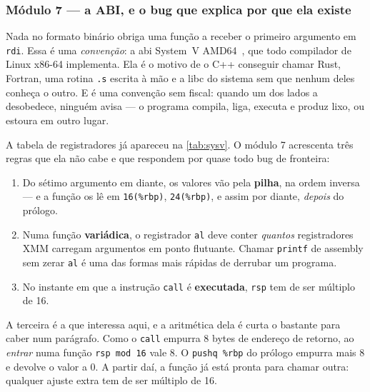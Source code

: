 \subsubsection{Módulo 7 --- a ABI, e o bug que explica por que ela existe}
\label{sec:asm-abi-bug}

\begin{porque}
Nada no formato binário obriga uma função a receber o primeiro argumento em
\texttt{rdi}. Essa é uma \emph{convenção}: a \gls{abi} System~V
AMD64~\cite{sysvabi}, que todo compilador de Linux x86-64 implementa. Ela é o
motivo de o C++ conseguir chamar Rust, Fortran, uma rotina \texttt{.s} escrita
à mão e a libc do sistema sem que nenhum deles conheça o outro. E é uma
convenção sem fiscal: quando um dos lados a desobedece, ninguém avisa --- o
programa compila, liga, executa e produz lixo, ou estoura em outro lugar.
\end{porque}

A tabela de registradores já apareceu na \cref{tab:sysv}. O módulo 7 acrescenta
três regras que ela não cabe e que respondem por quase todo bug de fronteira:

\begin{enumerate}
\item Do sétimo argumento em diante, os valores vão pela \textbf{pilha}, na
      ordem inversa --- e a função os lê em \texttt{16(\%rbp)},
      \texttt{24(\%rbp)}, e assim por diante, \emph{depois} do prólogo.
\item Numa função \textbf{variádica}, o registrador \texttt{al} deve conter
      \emph{quantos} registradores XMM carregam argumentos em ponto flutuante.
      Chamar \texttt{printf} de assembly sem zerar \texttt{al} é uma das formas
      mais rápidas de derrubar um programa.
\item No instante em que a instrução \texttt{call} é \textbf{executada},
      \texttt{rsp} tem de ser múltiplo de 16.
\end{enumerate}

A terceira é a que interessa aqui, e a aritmética dela é curta o bastante para
caber num parágrafo. Como o \texttt{call} empurra 8 bytes de endereço de
retorno, ao \emph{entrar} numa função \texttt{rsp mod 16} vale 8. O
\texttt{pushq \%rbp} do prólogo empurra mais 8 e devolve o valor a 0. A partir
daí, a função já está pronta para chamar outra: qualquer ajuste extra tem de
ser múltiplo de 16.

